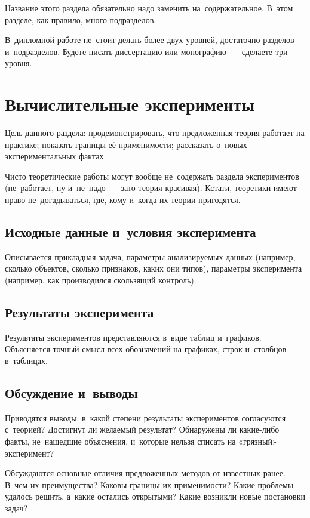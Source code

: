 \documentclass[12pt,fleqn]{article}
\begin{document}
Название этого раздела обязательно надо заменить на~содержательное. 
В~этом разделе, как правило, много подразделов. 

В~дипломной работе не~стоит делать более двух уровней,
достаточно разделов и~подразделов.
Будете писать диссертацию или монографию~--- сделаете три уровня. 
  
\section{Вычислительные эксперименты}

Цель данного раздела:
продемонстрировать, что предложенная теория работает на практике;
показать границы её применимости;
рассказать о~новых экспериментальных фактах.

Чисто теоретические работы могут вообще не~содержать раздела экспериментов
(не~работает, ну и~не~надо~--- зато теория красивая).
Кстати, теоретики имеют право не~догадываться, где, кому и~когда их теории пригодятся.

\subsection{Исходные данные и~условия эксперимента}
Описывается прикладная задача, параметры анализируемых данных 
(например, сколько объектов, сколько признаков, каких они типов), 
параметры эксперимента 
(например, как производился скользящий контроль). 

\subsection{Результаты эксперимента}
Результаты экспериментов представляются в~виде таблиц и~графиков. 
Объясняется точный смысл всех обозначений на графиках, строк и~столбцов в~таблицах. 

\subsection{Обсуждение и~выводы}
Приводятся выводы: 
в~какой степени результаты экспериментов согласуются с~теорией? 
Достигнут ли желаемый результат? 
Обнаружены ли какие-либо факты, не~нашедшие объяснения, и~которые нельзя списать на «грязный» эксперимент?

Обсуждаются основные отличия предложенных методов от известных ранее. 
В~чем их преимущества? 
Каковы границы их применимости? 
Какие проблемы удалось решить, а~какие остались открытыми? 
Какие возникли новые постановки задач?
\end{document}
